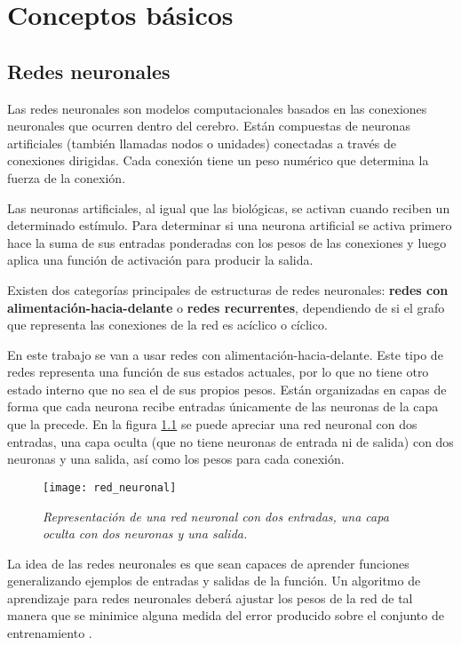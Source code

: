 \chapter{Conceptos básicos}
\label{BasicConcepts}

\section{Redes neuronales}
Las redes neuronales son modelos computacionales basados en las conexiones
neuronales que ocurren dentro del cerebro. Están compuestas de neuronas
artificiales (también llamadas nodos o unidades) conectadas a través de
conexiones dirigidas. Cada conexión tiene un peso numérico que determina la
fuerza de la conexión.

Las neuronas artificiales, al igual que las biológicas, se activan cuando
reciben un determinado estímulo. Para determinar si una neurona artificial se
activa primero hace la suma de sus entradas ponderadas con los pesos de las
conexiones y luego aplica una función de activación para producir la salida.

Existen dos categorías principales de estructuras de redes neuronales:
\textbf{redes con alimentación-hacia-delante} o \textbf{redes recurrentes},
dependiendo de si el grafo que representa las conexiones de la red es acíclico
o cíclico.

En este trabajo se van a usar redes con alimentación-hacia-delante. Este tipo
de redes representa una función de sus estados actuales, por lo que no tiene
otro estado interno que no sea el de sus propios pesos. Están organizadas en
capas de forma que cada neurona recibe entradas únicamente de las neuronas de
la capa que la precede. En la figura \ref{red_neuronal} se puede apreciar una
red neuronal con dos entradas, una capa oculta (que no tiene neuronas de
entrada ni de salida) con dos neuronas y una salida, así como los pesos para
cada conexión.

\begin{figure}
    \centering
    \caption{\textit{Representación de una red neuronal con dos entradas, una
    capa oculta con dos neuronas y una salida.}}
  \label{red_neuronal}
  \texttt{[image: red\_neuronal]}
\end{figure}

La idea de las redes neuronales es que sean capaces de aprender funciones
generalizando ejemplos de entradas y salidas de la función. Un algoritmo de
aprendizaje para redes neuronales deberá ajustar los pesos de la red de tal
manera que se minimice alguna medida del error producido sobre el conjunto de
entrenamiento \parencite{russel_norvig}.


